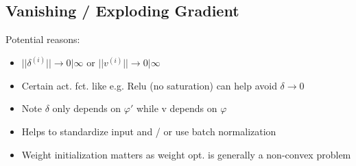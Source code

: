 \subsection{Vanishing / Exploding Gradient}

Potential reasons:
\begin{itemize}
    \item $||\delta^{(i)}|| \rightarrow 0 | \infty$ or $||v^{(i)}|| \rightarrow 0 | \infty$
    \item Certain act. fct. like e.g. Relu (no saturation) can help avoid $\delta \rightarrow 0$
    \item Note $\delta$ only depends on $\varphi'$ while v depends on $\varphi$
    \item Helps to standardize input and / or use batch normalization
    \item Weight initialization matters as weight opt. is generally a non-convex problem
\end{itemize}


